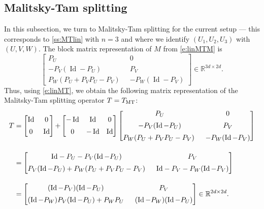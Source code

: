 \documentclass[11pt]{article}
\newcommand{\RR}{\ensuremath{\mathbb R}}
\newcommand{\Id}{\ensuremath{\operatorname{Id}}}
\newcommand{\tmt}{\ensuremath{T_{\text{\scriptsize MT}}}}
\theoremstyle{definition}
\providecommand{\RR}{\mathbb{R}}
\providecommand{\Id}{\operatorname{{ Id}}}
\providecommand{\Id}{\operatorname{Id}}
\providecommand{\RR}{\mathbb{R}}
\begin{document}
{\subsection{Malitsky-Tam splitting}

\label{ss:MTblock}

In this subsection, we turn to Malitsky-Tam splitting for the current setup
--- this corresponds to \cref{ss:MTlin} with $n=3$ and where
we identify $(U_1,U_2,U_3)$ with $(U,V,W)$.
The block matrix representation of $M$ from \cref{e:linMTM} is 
\begin{equation}
\begin{bmatrix}
P_U \;&  0 \\[0.5em]
-P_V(\Id-P_U) \;& P_V\\[0.5em]
P_W(P_U+P_VP_U-P_V)\;\; & -P_W(\Id-P_V)
\end{bmatrix}
\in\RR^{3d\times 2d}.
\label{e:MTMmat}
\end{equation}
Thus, using \cref{e:linMT}, 
we obtain the following matrix representation 
of the Malitsky-Tam splitting operator $T=\tmt$: 
\begin{subequations}
\label{e:220526a}
\begin{align}
T &=
\textcolor{black}{\begin{bmatrix}\Id\;&0\\[0.5em]0\;&\Id\end{bmatrix}+}
\begin{bmatrix}
-\Id & \Id & 0 \\[0.5em]
0 & -\Id & \Id
\end{bmatrix}
\begin{bmatrix}
P_U \;&  0 \\[0.5em]
-P_V(\Id-P_U) \;& P_V\\[0.5em]
P_W(P_U+P_VP_U-P_V)\;\; & -P_W(\Id-P_V)
\end{bmatrix}\\[1em]
&= 
\begin{bmatrix}
\textcolor{black}{\Id}-P_U-P_V(\Id-P_U) &\;\; P_V\\[0.5em]
P_V(\Id-P_U)+P_W(P_U+P_VP_U-P_V) & \;\; \textcolor{black}{\Id}-P_V-P_W(\Id-P_V)
\end{bmatrix}\\[1em]
&= 
\begin{bmatrix}
(\Id-P_V)(\Id-P_U) &\;\; P_V\\[0.5em]
(\Id-P_W)P_V(\Id-P_U)+P_WP_U & \;\; (\Id-P_W)(\Id-P_U)
\end{bmatrix}\in\RR^{2d\times 2d}. 
\end{align}

\end{subequations}}
\end{document}
